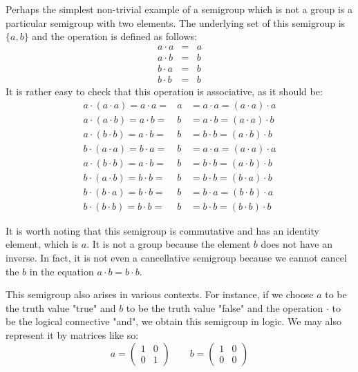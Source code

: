 \documentclass[12pt]{article}
\begin{document}
Perhaps the simplest non-trivial example of a semigroup which is not a group is a particular semigroup with two elements. The underlying set of this 
semigroup is $\{a,b\}$ and the operation is defined as follows:
\begin{eqnarray*}
a \cdot a &=& a \\
a \cdot b &=& b \\
b \cdot a &=& b \\
b \cdot b &=& b
\end{eqnarray*}
It is rather easy to check that this operation is associative, as it
should be: 
\begin{eqnarray*}
a \cdot (a \cdot a) = a \cdot a =& a &= a \cdot a = (a \cdot a) \cdot a \\
a \cdot (a \cdot b) = a \cdot b =& b &= a \cdot b = (a \cdot a) \cdot b \\
a \cdot (b \cdot b) = a \cdot b =& b &= b \cdot b = (a \cdot b) \cdot b \\
b \cdot (a \cdot a) = b \cdot a =& b &= a \cdot a = (a \cdot a) \cdot a \\
a \cdot (b \cdot b) = a \cdot b =& b &= b \cdot b = (a \cdot b) \cdot b \\
b \cdot (a \cdot b) = b \cdot b =& b &= b \cdot b = (b \cdot a) \cdot b \\
b \cdot (b \cdot a) = b \cdot b =& b &= b \cdot a = (b \cdot b) \cdot a \\
b \cdot (b \cdot b) = b \cdot b =& b &= b \cdot b = (b \cdot b) \cdot b
\end{eqnarray*}

It is worth noting that this semigroup is commutative and has an identity
element, which is $a$.  It is not a group because the element $b$ does
not have an inverse.  In fact, it is not even a cancellative semigroup
because we cannot cancel the $b$ in the equation $a \cdot b = b \cdot b$.

This semigroup also arises in various contexts.  For instance,
if we choose $a$ to be the truth value "true" and $b$ to be the truth
value "false" and the operation $\cdot$ to be the logical connective "and",
we obtain this semigroup in logic.  We may also represent it by matrices
like so:
\[a = \left( \begin{matrix} 1 & 0 \\ 0 & 1 \end{matrix} \right) \qquad  
b = \left( \begin{matrix} 1 & 0 \\ 0 & 0 \end{matrix} \right) \]
\end{document}
